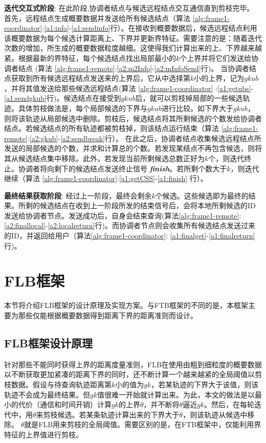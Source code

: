 \textbf{迭代交互式阶段}:  在此阶段,协调者结点与候选远程结点交互通信直到剪枝完毕。 首先，远程结点生成概要数据并发送给所有候选结点（算法 \ref{alg:frame1-coordinator}:\ref{a1:info}-\ref{a1:sendinfo}行）。在接收到概要数据后，候选远程结点利用该概要数据为每个候选计算距离上、下界并更新界特征。需要注意的是：随着迭代次数的增加，所生成的概要数据粒度越细。这使得我们计算出来的上、下界越来越紧。根据最新的界特征，每个候选结点找出局部最小的$k$个上界并将它们发送给协调者结点 (算法 \ref{alg:frame1-remote}:\ref{a2:m2Info}-\ref{a2:mInfoSend}行)。
当协调者结点获取到所有候选远程结点发送来的上界后，它从中选择第$k$小的上界，记为$gkub$，并将其值发送给那些候选远程结点(算法 \ref{alg:frame1-coordinator} :\ref{a1:getubs}-\ref{a1:sendgkub}行)。候选结点在接受到$gkub$后，就可以剪枝掉局部的一些候选轨迹。具体剪枝做法是，每个局部候选的下界与$gkub$进行比较。如下界大于$gkub$，则将该轨迹从局部候选中删除。剪枝后，候选结点将其所剩候选的个数发给协调者结点。若候选结点的所有轨迹都被剪枝掉，则该结点运行结束（算法 \ref{alg:frame1-remote}:\ref{a2:gkub}-\ref{a2:sendbreak}行）。 在此之后，协调者结点收集候选远程结点所发送的局部候选的个数，并求和计算总的个数。若发现某结点不再包含候选，则将其从候选结点集中移除。此外，若发现当前所剩候选总数正好为$k$个，则迭代终止。协调者将向剩下的候选结点发送终止信号 \emph{\textbf{finish}}。若所剩个数大于$k$，则迭代继续（算法 \ref{alg:frame1-coordinator}:\ref{a1:getCSS}-\ref{a1:finish} 行）。

\textbf{最终结果获取阶段}: 经过上一阶段，最终会剩余$k$个候选。这些候选即为最终的结果。所剩的候选结点在收到上一阶段所发的结束信号后，会将本地所剩候选的ID发送给协调者节点。发送成功后，自身会结束查询(算法\ref{alg:frame1-remote}: \ref{a2:finallocal}-\ref{a2:localreturn}行)。而协调者节点则会收集所有候选结点发送过来的ID，并返回给用户（算法\ref{alg:frame1-coordinator}: \ref{a1:finalget}-\ref{a1:finalreturn}行)。



\section{FLB框架}\label{sec-c3-FLB}
本节将介绍FLB框架的设计原理及实现方案。与FTB框架的不同的是，本框架主要为那些仅能根据概要数据得到距离下界的距离准则而设计。
\subsection{FLB框架设计原理}
针对那些不能同时获得上界的距离度量准则，FLB在使用由粗到细粒度的概要数据以不断获取更加紧凑的距离下界的同时，还不断计算一个越来越紧的全局阈值以剪枝数据。假设与待查询轨迹距离第$k$小的值为$gk$，若某轨迹的下界大于该值，则该轨迹不会成为最终结果。但$gk$值很难一开始就计算出来。为此，本文的做法是以最小的代价（通信和时间开销）计算$gk$的上界$\theta$，并不断将$\theta$逼近$gk$。然后，在每轮迭代中，用$\theta$来剪枝候选。若某条轨迹计算出来的下界大于$\theta$，则该轨迹从候选中移除。
$\theta$就是FLB用来剪枝的全局阈值。需要区别的是，在FTB框架中，仅能利用界特征的上界值进行剪枝。

